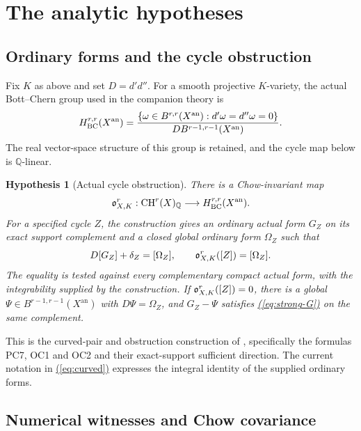 \documentclass[11pt,a4paper]{article}
\newtheorem{hypothesis}[theorem]{Hypothesis}
\theoremstyle{definition}
\theoremstyle{remark}\newtheorem{remark}[theorem]{Remark}
\numberwithin{equation}{section}
\newcommand{\Q}{\mathbb Q}\newcommand{\R}{\mathbb R}\newcommand{\C}{\mathbb C}
\newcommand{\CH}{\operatorname{CH}}\newcommand{\an}{\mathrm{an}}
\renewcommand{\eqref}[1]{\hyperref[#1]{\textcolor{equationlink}{(\ref*{#1})}}}
\begin{document}
\section{The analytic hypotheses}\label{sec:analytic}

\subsection{Ordinary forms and the cycle obstruction}\label{sub:obstruction}

Fix $K$ as above and set $D=d'd''$. For a smooth projective $K$-variety,
the actual Bott--Chern group used in the companion theory is
\begin{equation}\label{eq:BC}
 H_{\BC}^{r,r}(X^{\an})=
 \frac{\{\omega\in B^{r,r}(X^{\an}):d'\omega=d''\omega=0\}}
 {D B^{r-1,r-1}(X^{\an})}.
\end{equation}
The real vector-space structure of this group is retained, and the
cycle map below is $\Q$-linear.

\begin{hypothesis}[Actual cycle obstruction]\label{prop:obstruction}
There is a Chow-invariant map
\[
 \ob^r_{X,K}:\CH^r(X)_\Q\longrightarrow H_{\BC}^{r,r}(X^{\an}).
\]
For a specified cycle $Z$, the construction gives an ordinary actual
form $G_Z$ on its exact support complement and a closed global ordinary
form $\Omega_Z$ such that
\begin{equation}\label{eq:curved}
       D[G_Z]+\delta_Z=[\Omega_Z],
       \qquad \mathfrak o^r_{X,K}([Z])=[\Omega_Z].
\end{equation}
The equality is tested against every complementary compact actual form,
with the integrability supplied by the construction. If
$\mathfrak o^r_{X,K}([Z])=0$, there is a global
$\Psi\in B^{r-1,r-1}(X^{\an})$ with $D\Psi=\Omega_Z$, and
$G_Z-\Psi$ satisfies \eqref{eq:strong-G} on the same complement.
\end{hypothesis}

This is the curved-pair and obstruction construction of
\cite{InternalGreen}, specifically the formulas PC7, OC1 and OC2 and
their exact-support sufficient direction. The current notation in
\eqref{eq:curved} expresses the integral identity of the supplied
ordinary forms.

\subsection{Numerical witnesses and Chow covariance}\label{sub:covariance}
\end{document}
